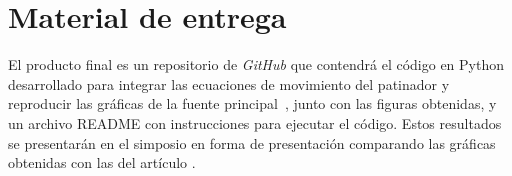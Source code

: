 \documentclass[12pt]{article}
\begin{document}
\section*{Material de entrega}
	


El producto final es un repositorio de \textit{GitHub} que contendrá el código en
Python desarrollado para integrar las ecuaciones de movimiento del patinador y
reproducir las gráficas de la fuente principal~\cite{gzenda2020}, junto con las
figuras obtenidas, y un archivo README con
instrucciones para ejecutar el código. Estos resultados se presentarán en el
simposio en forma de presentación comparando las gráficas obtenidas con las del artículo \cite{rocha2026symposium}.
	
	
	
	
	
	
	
	
	
	
	
	
	
	
	
\end{document}
